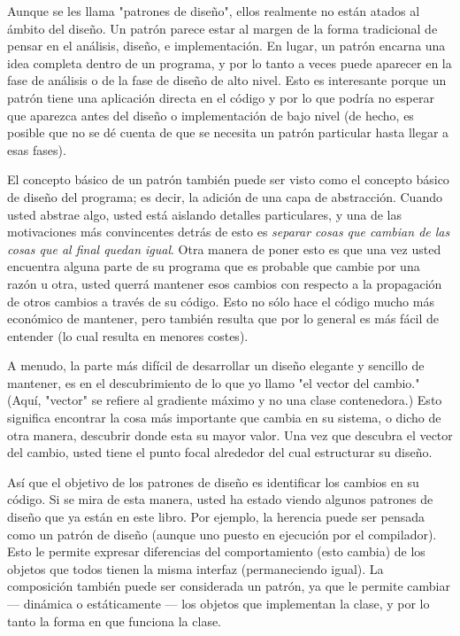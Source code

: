 Aunque se les llama "patrones de diseño", ellos realmente no están atados al ámbito del diseño. Un patrón parece estar al margen de la forma tradicional de pensar en el análisis, diseño, e implementación. En lugar, un patrón encarna una idea completa dentro de un programa, y por lo tanto a veces puede aparecer en la fase de análisis o de la fase de diseño de alto nivel. Esto es interesante porque un patrón tiene una aplicación directa en el código y por lo que podría no esperar que aparezca antes del diseño o implementación de bajo nivel (de hecho, es posible que no se dé cuenta de que se necesita un patrón particular hasta llegar a esas fases).      \newline

El concepto básico de un patrón también puede ser visto como el concepto básico de diseño del programa; es decir, la adición de una capa de abstracción. Cuando usted abstrae algo, usted está aislando detalles particulares, y una de las motivaciones más convincentes detrás de esto es \textit{separar cosas que cambian de las cosas que al final quedan igual}. Otra manera de poner esto es que una vez usted encuentra alguna parte de su programa que es probable que cambie por una razón u otra, usted querrá mantener esos cambios con respecto a la propagación de otros cambios a través de su código. Esto no sólo hace el código mucho más económico de mantener, pero también resulta que por lo general es más fácil de entender (lo cual resulta en menores costes).    \newline

A menudo, la parte más difícil de desarrollar un diseño elegante y sencillo de mantener, es en el descubrimiento de lo que yo llamo "el vector del cambio." (Aquí, "vector" se refiere al gradiente máximo y no una clase contenedora.) Esto significa encontrar la cosa más importante que cambia en su sistema, o dicho de otra manera, descubrir donde esta su mayor valor. Una vez que descubra el vector del cambio, usted tiene el punto focal alrededor del cual estructurar su diseño.      \newline

Así que el objetivo de los patrones de diseño es identificar los cambios en su código. Si se mira de esta manera, usted ha estado viendo algunos patrones de diseño que ya están en este libro. Por ejemplo, la herencia puede ser pensada como un patrón de diseño (aunque uno puesto en ejecución por el compilador). Esto le permite expresar diferencias del comportamiento (esto cambia) de los objetos que todos tienen la misma interfaz (permaneciendo igual). La composición también puede ser considerada un patrón, ya que le permite cambiar — dinámica o estáticamente — los objetos que implementan la clase, y por lo tanto la forma en que funciona la clase. \\

